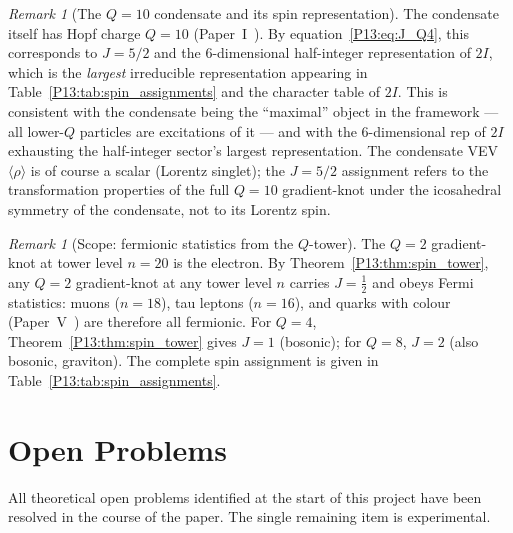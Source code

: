 \documentclass[11pt,a4paper]{article}
\theoremstyle{definition}
\theoremstyle{remark}
\newtheorem{remark}[theorem]{Remark}
\begin{document}
\begin{remark}[The $Q=10$ condensate and its spin representation]
\label{P13:rem:condensate_q10}
The condensate itself has Hopf charge $Q=10$ (Paper~I~\cite{Paper1}).
By equation~\eqref{P13:eq:J_Q4}, this corresponds to $J=5/2$ and the
$6$-dimensional half-integer representation of $2I$, which is
the \emph{largest} irreducible representation appearing in
Table~\ref{P13:tab:spin_assignments} and the character table of $2I$.
This is consistent with the condensate being the ``maximal'' object
in the framework — all lower-$Q$ particles are excitations of it —
and with the $6$-dimensional rep of $2I$ exhausting the half-integer
sector's largest representation.
The condensate VEV $\langle\rho\rangle$ is of course a scalar
(Lorentz singlet); the $J=5/2$ assignment refers to the transformation
properties of the full $Q=10$ gradient-knot under the icosahedral
symmetry of the condensate, not to its Lorentz spin.
\end{remark}

\begin{remark}[Scope: fermionic statistics from the $Q$-tower]
\label{P13:rem:scope_fermi}
The $Q=2$ gradient-knot at tower level $n=20$ is the electron.
By Theorem~\ref{P13:thm:spin_tower}, any $Q=2$ gradient-knot at any
tower level $n$ carries $J=\tfrac{1}{2}$ and obeys Fermi statistics:
muons ($n=18$), tau leptons ($n=16$), and quarks with colour
(Paper~V~\cite{Paper5}) are therefore all fermionic.
For $Q=4$, Theorem~\ref{P13:thm:spin_tower} gives $J=1$ (bosonic);
for $Q=8$, $J=2$ (also bosonic, graviton).
The complete spin assignment is given in Table~\ref{P13:tab:spin_assignments}.
\end{remark}

\section{Open Problems}
\label{P13:sec:open}

All theoretical open problems identified at the start of this project
have been resolved in the course of the paper.
The single remaining item is experimental.
\end{document}

